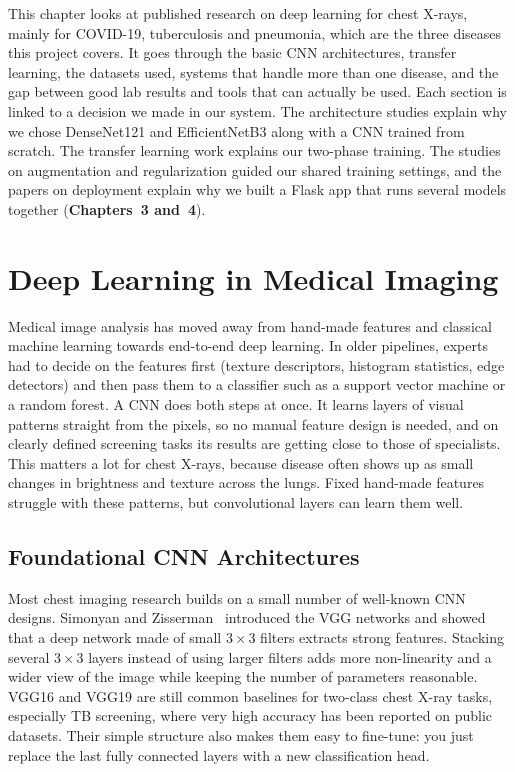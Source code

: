 
This chapter looks at published research on deep learning for chest X-rays, mainly for COVID-19, tuberculosis and pneumonia, which are the three diseases this project covers. It goes through the basic CNN architectures, transfer learning, the datasets used, systems that handle more than one disease, and the gap between good lab results and tools that can actually be used. Each section is linked to a decision we made in our system. The architecture studies explain why we chose DenseNet121 and EfficientNetB3 along with a CNN trained from scratch. The transfer learning work explains our two-phase training. The studies on augmentation and regularization guided our shared training settings, and the papers on deployment explain why we built a Flask app that runs several models together (\textbf{Chapters~3 and~4}).

\section{Deep Learning in Medical Imaging}

Medical image analysis has moved away from hand-made features and classical machine learning towards end-to-end deep learning. In older pipelines, experts had to decide on the features first (texture descriptors, histogram statistics, edge detectors) and then pass them to a classifier such as a support vector machine or a random forest. A CNN does both steps at once. It learns layers of visual patterns straight from the pixels, so no manual feature design is needed, and on clearly defined screening tasks its results are getting close to those of specialists. This matters a lot for chest X-rays, because disease often shows up as small changes in brightness and texture across the lungs. Fixed hand-made features struggle with these patterns, but convolutional layers can learn them well.

\subsection{Foundational CNN Architectures}

Most chest imaging research builds on a small number of well-known CNN designs. Simonyan and Zisserman~\cite{simonyan2014} introduced the VGG networks and showed that a deep network made of small $3\times3$ filters extracts strong features. Stacking several $3\times3$ layers instead of using larger filters adds more non-linearity and a wider view of the image while keeping the number of parameters reasonable. VGG16 and VGG19 are still common baselines for two-class chest X-ray tasks, especially TB screening, where very high accuracy has been reported on public datasets. Their simple structure also makes them easy to fine-tune: you just replace the last fully connected layers with a new classification head.

